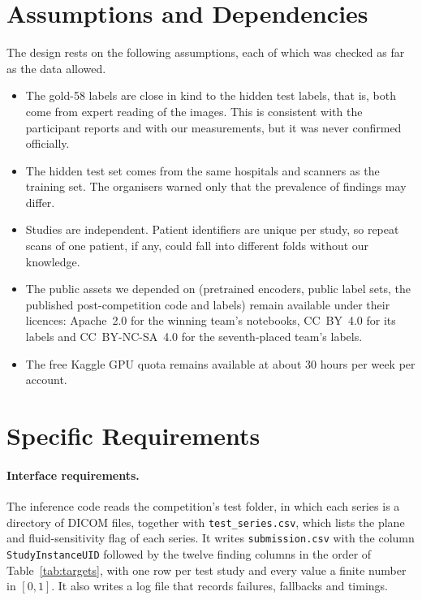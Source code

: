 \section{Assumptions and Dependencies}

The design rests on the following assumptions, each of which was checked as far as the data allowed.

\begin{itemize}[leftmargin=1.4em]
\item The gold-58 labels are close in kind to the hidden test labels, that is, both come from expert reading of the images. This is consistent with the participant reports and with our measurements, but it was never confirmed officially.
\item The hidden test set comes from the same hospitals and scanners as the training set. The organisers warned only that the prevalence of findings may differ.
\item Studies are independent. Patient identifiers are unique per study, so repeat scans of one patient, if any, could fall into different folds without our knowledge.
\item The public assets we depended on (pretrained encoders, public label sets, the published post-competition code and labels) remain available under their licences: Apache~2.0 for the winning team's notebooks, CC~BY~4.0 for its labels and CC~BY-NC-SA~4.0 for the seventh-placed team's labels.
\item The free Kaggle GPU quota remains available at about 30 hours per week per account.
\end{itemize}

\section{Specific Requirements}

\paragraph{Interface requirements.} The inference code reads the competition's test folder, in which each series is a directory of DICOM files, together with \texttt{test\_series.csv}, which lists the plane and fluid-sensitivity flag of each series. It writes \texttt{submission.csv} with the column \texttt{StudyInstanceUID} followed by the twelve finding columns in the order of Table~\ref{tab:targets}, with one row per test study and every value a finite number in $[0,1]$. It also writes a log file that records failures, fallbacks and timings.


